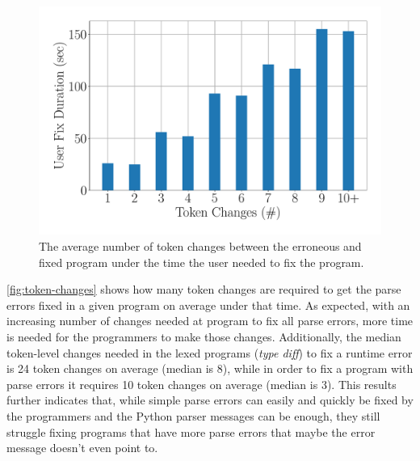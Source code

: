 \begin{figure}[t]
  \centering
  \includegraphics[width=0.7\linewidth]{median-repair-times.pdf}
  \caption{The average number of token changes between the erroneous and fixed
  program under the time the user needed to fix the program.}
  \label{fig:token-changes}
\end{figure}

 \autoref{fig:token-changes} shows how many token
changes are required to get the parse errors fixed in a given program on average
under that time. As expected, with an increasing number of changes needed at
program to fix all parse errors, more time is needed for the programmers to make
those changes. Additionally, the median token-level changes needed in the lexed
programs (\eg \emph{type diff}) to fix a runtime error is 24 token changes on
average (median is 8), while in order to fix a program with parse errors it
requires 10 token changes on average (median is 3). This results further
indicates that, while simple parse errors can easily and quickly be fixed by the
programmers and the Python parser messages can be enough, they still struggle
fixing programs that have more parse errors that maybe the error message doesn't
even point to.
